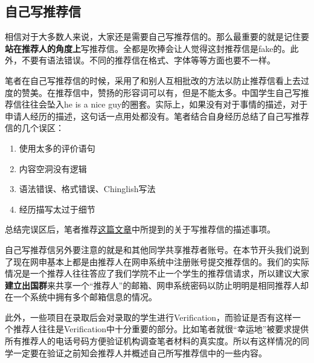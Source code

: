 \subsection{自己写推荐信}
相信对于大多数人来说，大家还是需要自己写推荐信的。那么最重要的就是记住要\textbf{站在推荐人的角度上}写推荐信。全都是吹捧会让人觉得这封推荐信是fake的。此外，不要有语法错误。不同的推荐信在格式、字体等等方面也要不一样。\par
笔者在自己写推荐信的时候，采用了和别人互相批改的方法以防止推荐信看上去过度的赞美。在推荐信中，赞扬的形容词可以有，但是不能太多。中国学生自己写推荐信往往会坠入he is a nice guy的圈套。实际上，如果没有对于事情的描述，对于申请人经历的描述，这句话一点用处都没有。笔者结合自身经历总结了自己写推荐信的几个误区：
\begin{enumerate}
\item 使用太多的评价语句
\item 内容空洞没有逻辑
\item 语法错误、格式错误、Chinglish写法
\item 经历描写太过于细节
\end{enumerate}\par
总结完误区后，笔者推荐\href{https://www.e-education.psu.edu/writingrecommendationlettersonline/node/112}{这篇文章}中所提到的关于写推荐信的描述事项。\par
自己写推荐信另外要注意的就是和其他同学共享推荐者账号。在本节开头我们说到了现在网申基本上都是由推荐人在网申系统中注册账号提交推荐信的。我们的实际情况是一个推荐人往往答应了我们学院不止一个学生的推荐信请求，所以建议大家\textbf{建立出国群}来共享一个“推荐人”的邮箱、网申系统密码以防止明明是相同推荐人却在一个系统中拥有多个邮箱信息的情况。\par
此外，一些项目在录取后会对录取的学生进行Verification，而验证是否有这样一个推荐人往往是Verification中十分重要的部分。比如笔者就很“幸运地”被要求提供所有推荐人的电话号码方便验证机构调查笔者材料的真实度。所以有这样情况的同学一定要在验证之前知会推荐人并概述自己所写推荐信中的一些内容。